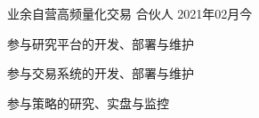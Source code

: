 
\begin{projitem}
    {业余自营高频量化交易}
    {合伙人}
    {2021年02月}{今}
    \item 参与研究平台的开发、部署与维护
    \item 参与交易系统的开发、部署与维护
    \item 参与策略的研究、实盘与监控
\end{projitem}



\endinput